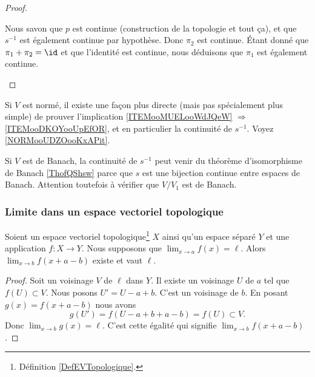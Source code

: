 \begin{proof}
\begin{subproof}
		Nous savon que \( p\) est continue (construction de la topologie et tout ça), et que \( s^{-1}\) est également continue par hypothèse. Donc \( \pi_2\) est continue. Étant donné que \( \pi_1+\pi_2=\id\) et que l'identité est continue, nous déduisons que \( \pi_1\) est également continue.
	\end{subproof}
\end{proof}


\begin{normaltext}
	Si \( V\) est normé, il existe une façon plus directe (mais pas spécialement plus simple) de prouver l'implication \ref{ITEMooMUELooWdJQeW} \( \Rightarrow\) \ref{ITEMooDKOYooUpEfOR}, et en particulier la continuité de \( s^{-1}\). Voyez \ref{NORMooUDZOooKxAPit}.

	Si \( V\) est de Banach, la continuité de \( s^{-1}\) peut venir du théorème d'isomorphisme de Banach \ref{ThofQShsw} parce que \( s\) est une bijection continue entre espaces de Banach. Attention toutefois à vérifier que \( V/V_1\) est de Banach.
\end{normaltext}


\subsubsection{Limite dans un espace vectoriel topologique}


\begin{lemma}      \label{LEMooAHIGooJhpPvo}
	Soient un espace vectoriel topologique\footnote{Définition \ref{DefEVTopologique}.} \( X\) ainsi qu'un espace séparé \( Y\) et une application \( f\colon X\to Y\). Nous supposons que \( \lim_{x\to a}f(x)=\ell\). Alors \( \lim_{x\to b} f(x+a-b)\) existe et vaut \( \ell\).
\end{lemma}

\begin{proof}
	Soit un voisinage \( V\) de \( \ell\) dans \( Y\). Il existe un voisinage \( U\) de \( a\) tel que \( f(U)\subset V\). Nous posons \( U'=U-a+b\). C'est un voisinage de \( b\). En posant \( g(x)=f(x+a-b)\) nous avons
	\begin{equation}
		g(U')=f(U-a+b+a-b)=f(U)\subset V.
	\end{equation}
	Donc \( \lim_{x\to b}g(x)=\ell\). C'est cette égalité qui signifie \( \lim_{x\to b}f(x+a-b)\).
\end{proof}


